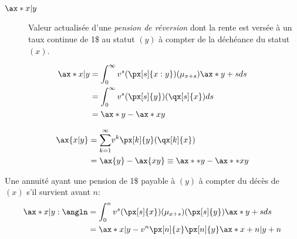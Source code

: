 \documentclass[10pt, french]{article}
\begin{document}
\begin{multicols*}{2}
\begin{distributions}[Notation]
\begin{description}
	\item[$\ax*{x | y}$]	Valeur actualisée d'une \textit{pension de réversion} dont la rente est versée à un taux continue de 1\$ au statut $(y)$ à compter de la déchéance du statut $(x)$.
\end{description}
\end{distributions}

\begin{align*}
	\ax*{x | y}
	&=	\int_{0}^{\infty} v^{s} (\px[s]{x:y})(\mu_{x + s}) \ax*{y + s} ds	\\
	&=	\int_{0}^{\infty} v^{s} (\px[s]{y})(\qx[s]{x}) ds	\\
	&=	\ax*{y}	-	\ax*{xy}
\end{align*}

\begin{align*}
	\ax{x | y}
	&=	\sumz{\infty}{k = 1} v^{k} \px[k]{y} (\qx[k]{x})	\\
	&=	\ax{y}	-	\ax{xy}
	\equiv	\ax**{y}		-	\ax**{xy}	\\
\end{align*}

Une annuité ayant une pension de 1\$ payable à $(y)$ à compter du décès de $(x)$ s'il survient avant $n$:
\begin{align*}
	\ax*{x | y:\angln}
	&=	\int_{0}^{n} v^{s} (\px[s]{x})(\mu_{x + s}) (\px[s]{y})\ax*{y + s}  ds	\\
	&=	\ax*{x | y}	-	v^{n} \px[n]{x} \px[n]{y} \ax*{x + n | y + n}
\end{align*}
\begin{center}

\begin{tikzpicture}[x=0.75pt,y=0.75pt,yscale=-1,xscale=1]


\end{tikzpicture}
\end{center}
\end{multicols*}
\end{document}
